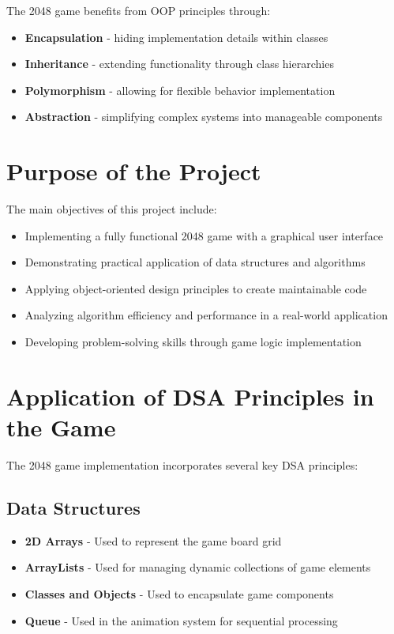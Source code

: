 \documentclass[12pt, a4paper]{article}
\begin{document}
The 2048 game benefits from OOP principles through:
\begin{itemize}
    \item \textbf{Encapsulation} - hiding implementation details within classes
    \item \textbf{Inheritance} - extending functionality through class hierarchies
    \item \textbf{Polymorphism} - allowing for flexible behavior implementation
    \item \textbf{Abstraction} - simplifying complex systems into manageable components
\end{itemize}

\section{Purpose of the Project}
The main objectives of this project include:
\begin{itemize}
    \item Implementing a fully functional 2048 game with a graphical user interface
    \item Demonstrating practical application of data structures and algorithms
    \item Applying object-oriented design principles to create maintainable code
    \item Analyzing algorithm efficiency and performance in a real-world application
    \item Developing problem-solving skills through game logic implementation
\end{itemize}

\section{Application of DSA Principles in the Game}
The 2048 game implementation incorporates several key DSA principles:

\subsection{Data Structures}
\begin{itemize}
    \item \textbf{2D Arrays} - Used to represent the game board grid
    \item \textbf{ArrayLists} - Used for managing dynamic collections of game elements
    \item \textbf{Classes and Objects} - Used to encapsulate game components
    \item \textbf{Queue} - Used in the animation system for sequential processing
\end{itemize}
\end{document}
